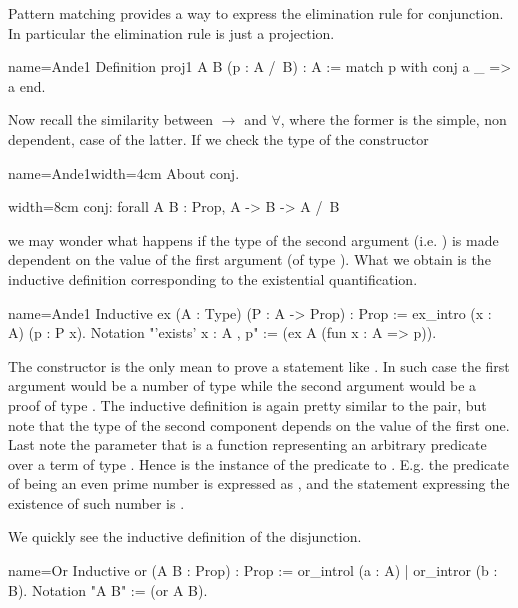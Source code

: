 Pattern matching provides a way to express the elimination rule for
conjunction.  In particular the elimination rule is just a projection.

\begin{coq}{name=Ande1}{}
Definition proj1 A B (p : A /\ B) : A :=
  match p with conj a _ => a end.
\end{coq}

Now recall the similarity between $\to$ and $\forall$, where the former is the
simple, non dependent, case of the latter.  If we check the type of
the  constructor

\begin{coq}{name=Ande1}{width=4cm}
About conj. 
\end{coq}
\begin{coqout}{}{width=8cm}
conj: forall A B : Prop, A -> B -> A /\ B
\end{coqout}
we may wonder what happens if the type of the second argument (i.e. ) is
made dependent on the value of the first argument (of type ).
What we obtain is the inductive definition corresponding to the
existential quantification.

\begin{coq}{name=Ande1}{}
Inductive ex (A : Type) (P : A -> Prop) : Prop :=
  ex_intro (x : A) (p : P x).
Notation "'exists' x : A , p" := (ex A (fun x : A => p)).
\end{coq}

The  constructor is the only mean to prove a statement like
.  In such case the first argument would be a number
 of type  while the second argument would be a proof  of type
.  The  inductive definition is again pretty similar to the
pair, but note that the type of the second component depends on the value of
the first one.  Last note the parameter  that is a function
representing an arbitrary predicate over a term of
type .  Hence  is the instance of the predicate to .  E.g.
the predicate of being an even prime number is expressed as
, and the statement expressing the
existence of such number is
.

We quickly see the inductive definition of the disjunction.

\begin{coq}{name=Or}{}
Inductive or (A B : Prop) : Prop := or_introl (a : A) | or_intror (b : B).
Notation "A \/ B" := (or A B).
\end{coq}

